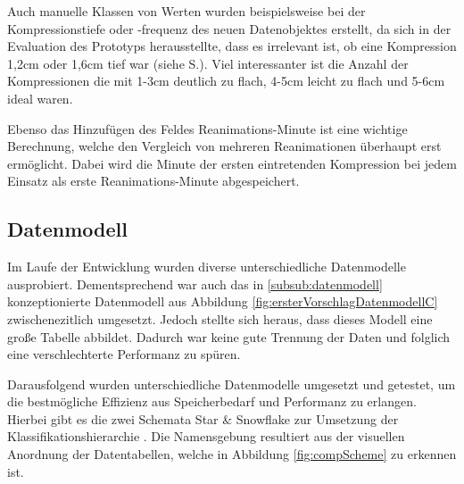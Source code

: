 Auch manuelle Klassen von Werten wurden beispielsweise bei der Kompressionstiefe oder -frequenz des neuen Datenobjektes erstellt, da sich in der Evaluation des Prototyps herausstellte, dass es irrelevant ist, ob eine Kompression 1,2cm oder 1,6cm tief war (siehe S.\pageref{par:binning}).
Viel interessanter ist die Anzahl der Kompressionen die mit 1-3cm deutlich zu flach, 4-5cm leicht zu flach und 5-6cm ideal waren.

Ebenso das Hinzufügen des Feldes \glqq Reanimations-Minute\grqq{} ist eine wichtige Berechnung, welche den Vergleich von mehreren Reanimationen überhaupt erst ermöglicht.
Dabei wird die Minute der ersten eintretenden Kompression bei jedem Einsatz als erste \glqq Reanimations-Minute\grqq{} abgespeichert. 

\subsection{Datenmodell}
\label{sub:datenmodell}
Im Laufe der Entwicklung wurden diverse unterschiedliche Datenmodelle ausprobiert.
Dementsprechend war auch das in \ref{subsub:datenmodell} konzeptionierte Datenmodell aus Abbildung \ref{fig:ersterVorschlagDatenmodellC} zwischenezitlich umgesetzt.
Jedoch stellte sich heraus, dass dieses Modell eine große Tabelle abbildet.
Dadurch war keine gute Trennung der Daten und folglich eine verschlechterte Performanz zu spüren.

Darausfolgend wurden unterschiedliche Datenmodelle umgesetzt und getestet, um die bestmögliche Effizienz aus Speicherbedarf und Performanz zu erlangen.
Hierbei gibt es die zwei Schemata \glqq Star\grqq{} \& \glqq Snowflake\grqq{} zur Umsetzung der Klassifikationshierarchie \cite{Kimball.2013}.
Die Namensgebung resultiert aus der visuellen Anordnung der Datentabellen, welche in Abbildung \ref{fig:compScheme} zu erkennen ist.

